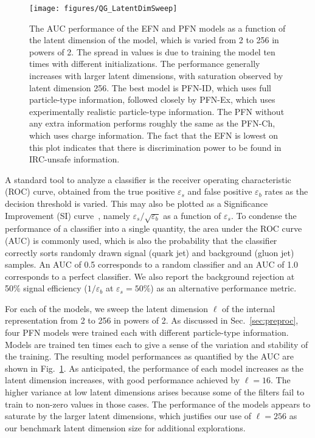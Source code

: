 \documentclass[letterpaper,11pt]{article}
\DeclareRobustCommand{\Sec}[1]{Sec.~\ref{#1}}
\DeclareRobustCommand{\Fig}[1]{Fig.~\ref{#1}}
\begin{document}
\begin{figure}[t]
\centering
\texttt{[image: figures/QG\_LatentDimSweep]}
\caption{The AUC performance of the EFN and PFN models as a function of the latent dimension of the model, which is varied from 2 to 256 in powers of 2.
%
The spread in values is due to training the model ten times with different initializations.
%
The performance generally increases with larger latent dimensions, with saturation observed by latent dimension 256.
%
The best model is PFN-ID, which uses full particle-type information, followed closely by PFN-Ex, which uses experimentally realistic particle-type information.
%
The PFN without any extra information performs roughly the same as the PFN-Ch, which uses charge information.
%
The fact that the EFN is lowest on this plot indicates that there is discrimination power to be found in IRC-unsafe information.}
\label{fig:qgdimsweep}
\end{figure}


A standard tool to analyze a classifier is the receiver operating characteristic (ROC) curve, obtained from the true positive $\varepsilon_s$ and false positive $\varepsilon_b$ rates as the decision threshold is varied.
%
This may also be plotted as a Significance Improvement (SI) curve~\cite{Gallicchio:2012ez}, namely $\varepsilon_s/\sqrt{\varepsilon_b}$ as a function of $\varepsilon_s$.
%
To condense the performance of a classifier into a single quantity, the area under the ROC curve (AUC) is commonly used, which is also the probability that the classifier correctly sorts randomly drawn signal (quark jet) and background (gluon jet) samples.
%
An AUC of 0.5 corresponds to a random classifier and an AUC of 1.0 corresponds to a perfect classifier.
%
We also report the background rejection at 50\% signal efficiency ($1/\varepsilon_b$ at $\varepsilon_s=50\%$) as an alternative performance metric.


For each of the models, we sweep the latent dimension $\ell$ of the internal representation from 2 to 256 in powers of 2.
%
As discussed in \Sec{sec:preproc}, four PFN models were trained each with different particle-type information.
%
Models are trained ten times each to give a sense of the variation and stability of the training.
%
The resulting model performances as quantified by the AUC are shown in \Fig{fig:qgdimsweep}.
%
As anticipated, the performance of each model increases as the latent dimension increases, with good performance achieved by $\ell=16$.
%
The higher variance at low latent dimensions arises because some of the filters fail to train to non-zero values in those cases.
%
The performance of the models appears to saturate by the larger latent dimensions, which justifies our use of $\ell=256$ as our benchmark latent dimension size for additional explorations.
\end{document}
